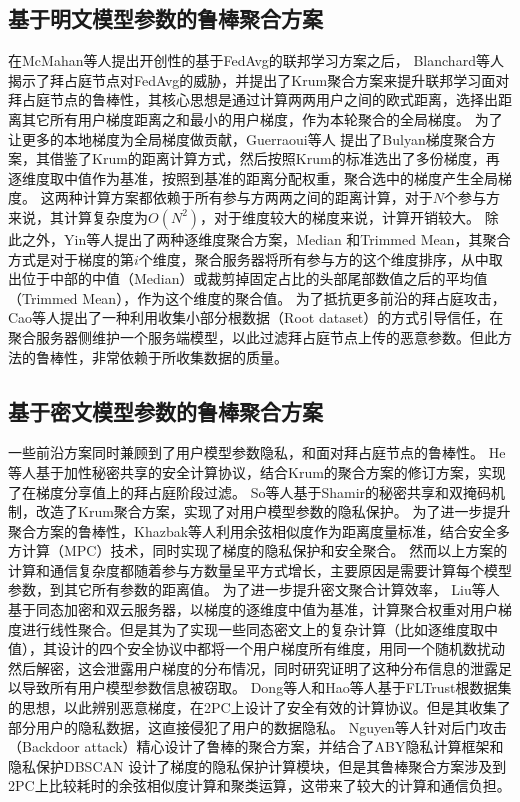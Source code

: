 \subsection{基于明文模型参数的鲁棒聚合方案}
在McMahan等人\cite{mcmahan2017communication}提出开创性的基于FedAvg的联邦学习方案之后，
Blanchard等人\cite{blanchard2017machine}揭示了拜占庭节点对FedAvg的威胁，并提出了Krum聚合方案来提升联邦学习面对拜占庭节点的鲁棒性，其核心思想是通过计算两两用户之间的欧式距离，选择出距离其它所有用户梯度距离之和最小的用户梯度，作为本轮聚合的全局梯度。
为了让更多的本地梯度为全局梯度做贡献，Guerraoui等人 \cite{guerraoui2018hidden}提出了Bulyan梯度聚合方案，其借鉴了Krum的距离计算方式，然后按照Krum的标准选出了多份梯度，再逐维度取中值作为基准，按照到基准的距离分配权重，聚合选中的梯度产生全局梯度。
这两种计算方案都依赖于所有参与方两两之间的距离计算，对于$N$个参与方来说，其计算复杂度为$O(N^2)$，对于维度较大的梯度来说，计算开销较大。
除此之外，Yin等人\cite{yin2018byzantine}提出了两种逐维度聚合方案，Median 和Trimmed Mean，其聚合方式是对于梯度的第$i$个维度，聚合服务器将所有参与方的这个维度排序，从中取出位于中部的中值（Median）或裁剪掉固定占比的头部尾部数值之后的平均值（Trimmed Mean），作为这个维度的聚合值。
为了抵抗更多前沿的拜占庭攻击，Cao等人\cite{DBLP:conf/ndss/CaoF0G21}提出了一种利用收集小部分根数据（Root dataset）的方式引导信任，在聚合服务器侧维护一个服务端模型，以此过滤拜占庭节点上传的恶意参数。但此方法的鲁棒性，非常依赖于所收集数据的质量。

\subsection{基于密文模型参数的鲁棒聚合方案}
一些前沿方案同时兼顾到了用户模型参数隐私，和面对拜占庭节点的鲁棒性。
He等人\cite{he2020secure}基于加性秘密共享的安全计算协议，结合Krum的聚合方案的修订方案，实现了在梯度分享值上的拜占庭阶段过滤。
So等人\cite{so2020byzantine}基于Shamir的秘密共享和双掩码机制，改造了Krum聚合方案，实现了对用户模型参数的隐私保护。
为了进一步提升聚合方案的鲁棒性，Khazbak等人\cite{khazbak2020mlguard}利用余弦相似度作为距离度量标准，结合安全多方计算（MPC）技术，同时实现了梯度的隐私保护和安全聚合。
然而以上方案的计算和通信复杂度都随着参与方数量呈平方式增长，主要原因是需要计算每个模型参数，到其它所有参数的距离值。
为了进一步提升密文聚合计算效率，
Liu等人\cite{liu2021privacy}基于同态加密和双云服务器，以梯度的逐维度中值为基准，计算聚合权重对用户梯度进行线性聚合。但是其为了实现一些同态密文上的复杂计算（比如逐维度取中值），其设计的四个安全协议中都将一个用户梯度所有维度，用同一个随机数扰动然后解密，这会泄露用户梯度的分布情况，同时研究\cite{comments}证明了这种分布信息的泄露足以导致所有用户模型参数信息被窃取。
Dong等人\cite{dong2021flod}和Hao等人\cite{hao2021efficient}基于FLTrust\cite{DBLP:conf/ndss/CaoF0G21}根数据集的思想，以此辨别恶意梯度，在2PC上设计了安全有效的计算协议。但是其收集了部分用户的隐私数据，这直接侵犯了用户的数据隐私。
Nguyen等人\cite{nguyen2022flame}针对后门攻击（Backdoor attack）精心设计了鲁棒的聚合方案，并结合了ABY隐私计算框架\cite{demmler2015aby}和隐私保护DBSCAN \cite{bozdemir2021privacy}设计了梯度的隐私保护计算模块，但是其鲁棒聚合方案涉及到2PC上比较耗时的余弦相似度计算和聚类运算，这带来了较大的计算和通信负担。

